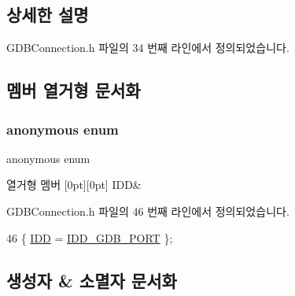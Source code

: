 \subsection{상세한 설명}


G\+D\+B\+Connection.\+h 파일의 34 번째 라인에서 정의되었습니다.



\subsection{멤버 열거형 문서화}
\mbox{\label{class_g_d_b_port_dlg_a04b7310ce182cc037cf3e74852d61ebb}} 
\subsubsection{\texorpdfstring{anonymous enum}{anonymous enum}}
{\footnotesize\ttfamily anonymous enum}

\begin{DoxyEnumFields}{열거형 멤버}
[0pt][0pt]{}\mbox{\label{class_g_d_b_port_dlg_a04b7310ce182cc037cf3e74852d61ebba59167ee2b7092de6e5cacd6ef77f3cff}} 
I\+DD&\\
\hline

\end{DoxyEnumFields}


G\+D\+B\+Connection.\+h 파일의 46 번째 라인에서 정의되었습니다.


\begin{DoxyCode}
46 \{ \mbox{\hyperlink{class_g_d_b_port_dlg_a04b7310ce182cc037cf3e74852d61ebba59167ee2b7092de6e5cacd6ef77f3cff}{IDD}} = \mbox{\hyperlink{resource_8h_a9efb93f51b799811ab66236dfd7684b8}{IDD\_GDB\_PORT}} \};
\end{DoxyCode}


\subsection{생성자 \& 소멸자 문서화}
\mbox{\label{class_g_d_b_port_dlg_aaae63af104a2adb206c99bcb33e22794}} 
